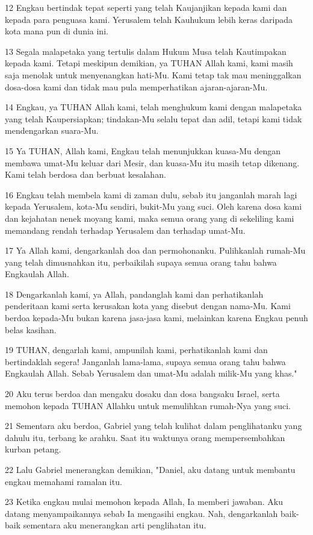 \par 12 Engkau bertindak tepat seperti yang telah Kaujanjikan kepada kami dan kepada para penguasa kami. Yerusalem telah Kauhukum lebih keras daripada kota mana pun di dunia ini.
\par 13 Segala malapetaka yang tertulis dalam Hukum Musa telah Kautimpakan kepada kami. Tetapi meskipun demikian, ya TUHAN Allah kami, kami masih saja menolak untuk menyenangkan hati-Mu. Kami tetap tak mau meninggalkan dosa-dosa kami dan tidak mau pula memperhatikan ajaran-ajaran-Mu.
\par 14 Engkau, ya TUHAN Allah kami, telah menghukum kami dengan malapetaka yang telah Kaupersiapkan; tindakan-Mu selalu tepat dan adil, tetapi kami tidak mendengarkan suara-Mu.
\par 15 Ya TUHAN, Allah kami, Engkau telah menunjukkan kuasa-Mu dengan membawa umat-Mu keluar dari Mesir, dan kuasa-Mu itu masih tetap dikenang. Kami telah berdosa dan berbuat kesalahan.
\par 16 Engkau telah membela kami di zaman dulu, sebab itu janganlah marah lagi kepada Yerusalem, kota-Mu sendiri, bukit-Mu yang suci. Oleh karena dosa kami dan kejahatan nenek moyang kami, maka semua orang yang di sekeliling kami memandang rendah terhadap Yerusalem dan terhadap umat-Mu.
\par 17 Ya Allah kami, dengarkanlah doa dan permohonanku. Pulihkanlah rumah-Mu yang telah dimusnahkan itu, perbaikilah supaya semua orang tahu bahwa Engkaulah Allah.
\par 18 Dengarkanlah kami, ya Allah, pandanglah kami dan perhatikanlah penderitaan kami serta kerusakan kota yang disebut dengan nama-Mu. Kami berdoa kepada-Mu bukan karena jasa-jasa kami, melainkan karena Engkau penuh belas kasihan.
\par 19 TUHAN, dengarlah kami, ampunilah kami, perhatikanlah kami dan bertindaklah segera! Janganlah lama-lama, supaya semua orang tahu bahwa Engkaulah Allah. Sebab Yerusalem dan umat-Mu adalah milik-Mu yang khas."
\par 20 Aku terus berdoa dan mengaku dosaku dan dosa bangsaku Israel, serta memohon kepada TUHAN Allahku untuk memulihkan rumah-Nya yang suci.
\par 21 Sementara aku berdoa, Gabriel yang telah kulihat dalam penglihatanku yang dahulu itu, terbang ke arahku. Saat itu waktunya orang mempersembahkan kurban petang.
\par 22 Lalu Gabriel menerangkan demikian, "Daniel, aku datang untuk membantu engkau memahami ramalan itu.
\par 23 Ketika engkau mulai memohon kepada Allah, Ia memberi jawaban. Aku datang menyampaikannya sebab Ia mengasihi engkau. Nah, dengarkanlah baik-baik sementara aku menerangkan arti penglihatan itu.
